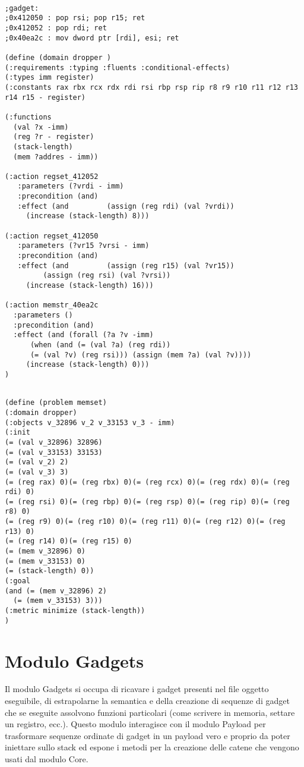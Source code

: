 \begin{lstlisting}

;gadget: 
;0x412050 : pop rsi; pop r15; ret
;0x412052 : pop rdi; ret
;0x40ea2c : mov dword ptr [rdi], esi; ret

(define (domain dropper )
(:requirements :typing :fluents :conditional-effects)
(:types imm register)
(:constants rax rbx rcx rdx rdi rsi rbp rsp rip r8 r9 r10 r11 r12 r13 r14 r15 - register)

(:functions 
  (val ?x -imm)
  (reg ?r - register)
  (stack-length)
  (mem ?addres - imm))

(:action regset_412052
   :parameters (?vrdi - imm)
   :precondition (and)
   :effect (and         (assign (reg rdi) (val ?vrdi))
     (increase (stack-length) 8)))

(:action regset_412050
   :parameters (?vr15 ?vrsi - imm)
   :precondition (and)
   :effect (and         (assign (reg r15) (val ?vr15))
         (assign (reg rsi) (val ?vrsi))
     (increase (stack-length) 16)))

(:action memstr_40ea2c
  :parameters ()
  :precondition (and)
  :effect (and (forall (?a ?v -imm) 
      (when (and (= (val ?a) (reg rdi))
      (= (val ?v) (reg rsi))) (assign (mem ?a) (val ?v))))
     (increase (stack-length) 0)))
)


\end{lstlisting}
\label{pddl:domain}


\begin{lstlisting}
(define (problem memset)
(:domain dropper)
(:objects v_32896 v_2 v_33153 v_3 - imm)
(:init
(= (val v_32896) 32896)
(= (val v_33153) 33153)
(= (val v_2) 2)
(= (val v_3) 3)
(= (reg rax) 0)(= (reg rbx) 0)(= (reg rcx) 0)(= (reg rdx) 0)(= (reg rdi) 0)
(= (reg rsi) 0)(= (reg rbp) 0)(= (reg rsp) 0)(= (reg rip) 0)(= (reg r8) 0)
(= (reg r9) 0)(= (reg r10) 0)(= (reg r11) 0)(= (reg r12) 0)(= (reg r13) 0)
(= (reg r14) 0)(= (reg r15) 0)
(= (mem v_32896) 0)
(= (mem v_33153) 0)
(= (stack-length) 0))
(:goal 
(and (= (mem v_32896) 2)
  (= (mem v_33153) 3)))
(:metric minimize (stack-length))
)
\end{lstlisting}
\label{pddl:facts}


\section{Modulo Gadgets}

Il modulo Gadgets si occupa di ricavare i gadget presenti nel file
oggetto eseguibile, di estrapolarne la semantica e della creazione di
sequenze di gadget che se eseguite assolvono funzioni particolari
(come scrivere in memoria, settare un registro, ecc.). Questo modulo
interagisce con il modulo Payload per trasformare sequenze ordinate di
gadget in un payload vero e proprio da poter iniettare sullo stack ed
espone i metodi per la creazione delle catene che vengono usati dal
modulo Core.

